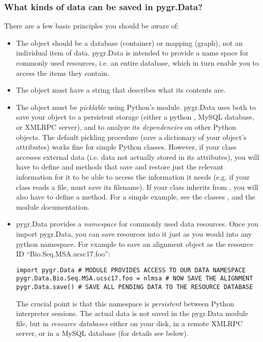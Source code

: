 \documentclass{howto}
\begin{document}
\subsubsection{What kinds of data can be saved in pygr.Data?}
There are a few basic principles you should be aware of:
\begin{itemize}
\item The object should be a database (container) or mapping (graph),
not an individual item of data.  pygr.Data is intended to provide
a name space for commonly used resources, i.e. an entire database,
which in turn enable you to access the items they contain.

\item The object must have a  string that describes
what its contents are.

\item The object must be {\em picklable} using Python's 
module.  pygr.Data uses  both to save your object to 
a persistent storage (either a python , MySQL database,
or XMLRPC server), and to analyze its {\em dependencies} on other
Python objects.  The default pickling procedure (save a dictionary of
your object's attributes) works fine for simple Python classes.
However, if your class accesses external data (i.e. data not actually
stored in its attributes), you will have to define 
and  methods that save and restore just the 
relevant information for it to be able to access the information
it needs (e.g. if your class reads a file,  must
save its filename).  If your class inherits from , you
will also have to define a  method.  For a simple
example, see the classes , and the  module documentation.

\item pygr.Data provides a {\em namespace} for commonly used data resources.
Once you import pygr.Data, you can save resources into it just as you would into
any python namespace.  For example to save an alignment object 
as the resource ID ``Bio.Seq.MSA.ucsc17.foo'':
\begin{verbatim}
import pygr.Data # MODULE PROVIDES ACCESS TO OUR DATA NAMESPACE
pygr.Data.Bio.Seq.MSA.ucsc17.foo = nlmsa # NOW SAVE THE ALIGNMENT
pygr.Data.save() # SAVE ALL PENDING DATA TO THE RESOURCE DATABASE
\end{verbatim}
The crucial point is that this namespace is {\em persistent} between
Python interpreter sessions.  The actual data is not saved in the pygr.Data 
module file, but in {\em resource databases} either on your disk, in
a remote XMLRPC server, or in a MySQL database (for details see below).


\end{itemize}
\end{document}
